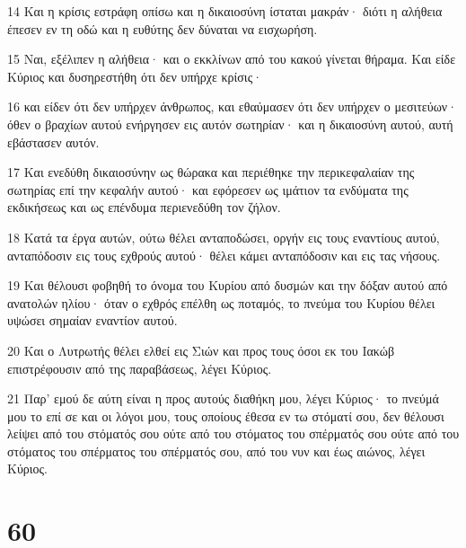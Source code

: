 \par 14 Και η κρίσις εστράφη οπίσω και η δικαιοσύνη ίσταται μακράν· διότι η αλήθεια έπεσεν εν τη οδώ και η ευθύτης δεν δύναται να εισχωρήση.
\par 15 Ναι, εξέλιπεν η αλήθεια· και ο εκκλίνων από του κακού γίνεται θήραμα. Και είδε Κύριος και δυσηρεστήθη ότι δεν υπήρχε κρίσις·
\par 16 και είδεν ότι δεν υπήρχεν άνθρωπος, και εθαύμασεν ότι δεν υπήρχεν ο μεσιτεύων· όθεν ο βραχίων αυτού ενήργησεν εις αυτόν σωτηρίαν· και η δικαιοσύνη αυτού, αυτή εβάστασεν αυτόν.
\par 17 Και ενεδύθη δικαιοσύνην ως θώρακα και περιέθηκε την περικεφαλαίαν της σωτηρίας επί την κεφαλήν αυτού· και εφόρεσεν ως ιμάτιον τα ενδύματα της εκδικήσεως και ως επένδυμα περιενεδύθη τον ζήλον.
\par 18 Κατά τα έργα αυτών, ούτω θέλει ανταποδώσει, οργήν εις τους εναντίους αυτού, ανταπόδοσιν εις τους εχθρούς αυτού· θέλει κάμει ανταπόδοσιν και εις τας νήσους.
\par 19 Και θέλουσι φοβηθή το όνομα του Κυρίου από δυσμών και την δόξαν αυτού από ανατολών ηλίου· όταν ο εχθρός επέλθη ως ποταμός, το πνεύμα του Κυρίου θέλει υψώσει σημαίαν εναντίον αυτού.
\par 20 Και ο Λυτρωτής θέλει ελθεί εις Σιών και προς τους όσοι εκ του Ιακώβ επιστρέφουσιν από της παραβάσεως, λέγει Κύριος.
\par 21 Παρ' εμού δε αύτη είναι η προς αυτούς διαθήκη μου, λέγει Κύριος· το πνεύμά μου το επί σε και οι λόγοι μου, τους οποίους έθεσα εν τω στόματί σου, δεν θέλουσι λείψει από του στόματός σου ούτε από του στόματος του σπέρματός σου ούτε από του στόματος του σπέρματος του σπέρματός σου, από του νυν και έως αιώνος, λέγει Κύριος.

\chapter{60}

